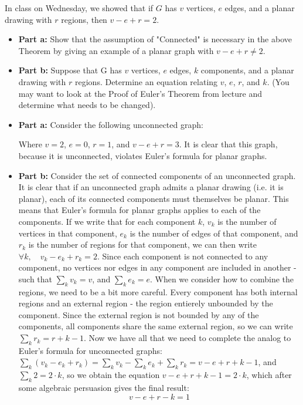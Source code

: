 \documentclass{article}
\begin{document}
\begin{problem} In class on Wednesday, we showed that if $G$ has $v$ vertices, $e$ edges, and a planar drawing with $r$ regions, then $v-e+r=2$.
\begin{itemize}
	\item[]{\textbf{Part a:}} Show that the assumption of "Connected" is necessary in the above Theorem by giving an example of a planar graph with $v-e+r \neq 2$.
	\item[]{\textbf{Part b:}} Suppose that G has $v$ vertices, $e$ edges, $k$ components, and a planar drawing with $r$ regions.  Determine an equation relating $v$, $e$, $r$, and $k$. (You may want to look at the Proof of Euler's Theorem from lecture and determine what needs to be changed).
\end{itemize}
\end{problem}

\begin{solution}
\begin{itemize}
	\item[]{\textbf{Part a:}} Consider the following unconnected graph:
		\vskip 0.15in \noindent
		\vskip 0.15in \noindent
		Where $v = 2$, $e = 0$, $r = 1$, and $v - e + r = 3$.  It is clear that this graph, 		because it is unconnected, violates Euler's formula for planar graphs.
	\item[]{\textbf{Part b:}} Consider the set of connected components of an unconnected graph.  It is clear that if an unconnected graph admits a planar drawing (i.e. it is planar), each of its connected components must themselves be planar.  This means that Euler's formula for planar graphs applies to each of the components. If we write that for each component $k$, $v_k$ is the number of vertices in that component, $e_k$ is the number of edges of that component, and $r_k$ is the number of regions for that component, we can then write $\forall k, \quad v_k-e_k+r_k=2$.  Since each component is not connected to any component, no vertices nor edges in any component are included in another - such that $\sum_k v_k = v$, and $\sum_k e_k = e$.  When we consider how to combine the regions, we need to be a bit more careful.  Every component has both internal regions and an external region - the region entierely unbounded by the component.  Since the external region is not bounded by any of the components, all components share the same external region, so we can write $\sum_k r_k = r + k - 1$. Now we have all that we need to complete the analog to Euler's formula for unconnected graphs: $\sum_k (v_k-e_k+r_k) = \sum_k v_k - \sum_k e_k + \sum_k r_k = v - e + r + k - 1$,  and $\sum_k 2 = 2 \cdot k$, so we obtain the equation $v-e+r+k-1=2\cdot k$, which after some algebraic persuasion gives the final result:
$$v-e+r-k=1$$
	
\end{itemize}
\end{solution}
\end{document}
